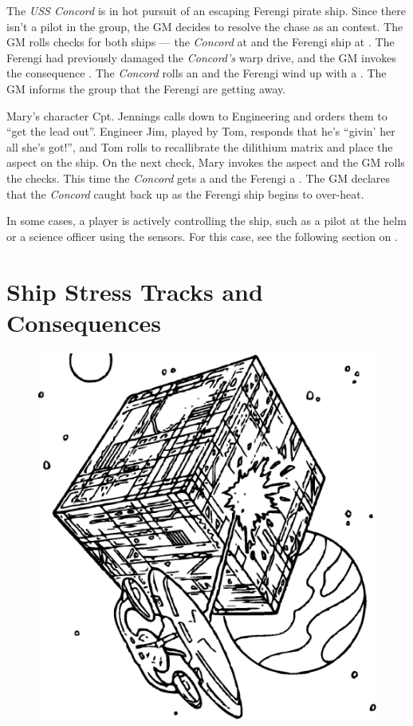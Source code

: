 \documentclass[12pt,titlepage,openany]{book}
\begin{document}
\begin{example}
    The \emph{USS Concord} is in hot pursuit of an escaping Ferengi pirate
    ship. Since there isn't a pilot in the group, the GM decides to resolve the
    chase as an  contest. The GM rolls  checks
    for both ships --- the \emph{Concord} at  and the Ferengi ship
    at . The Ferengi had previously damaged the \emph{Concord's}
    warp drive, and the GM invokes the consequence . The \emph{Concord} rolls an  and the Ferengi wind up
    with a . The GM informs the group that the Ferengi are getting
    away.

    Mary's character Cpt. Jennings calls down to Engineering and orders them to
    ``get the lead out''. Engineer Jim, played by Tom, responds that he's
    ``givin' her all she's got!'', and Tom rolls  to
    recallibrate the dilithium matrix and place the aspect  on the ship. On the next  check, Mary invokes the
    aspect and the GM rolls the checks. This time the \emph{Concord} gets a
     and the Ferengi a . The GM declares that the
    \emph{Concord} caught back up as the Ferengi ship begins to over-heat.
\end{example}

In some cases, a player is actively controlling the ship, such as a pilot at
the helm or a science officer using the sensors. For this case, see the
following section on .

\section{Ship Stress Tracks and Consequences}\label{sec:ship-stress}
\begin{figure}
    \centering
    \includegraphics[width=0.9\linewidth]{img/Borg.eps}\\
\end{figure}
\end{document}
